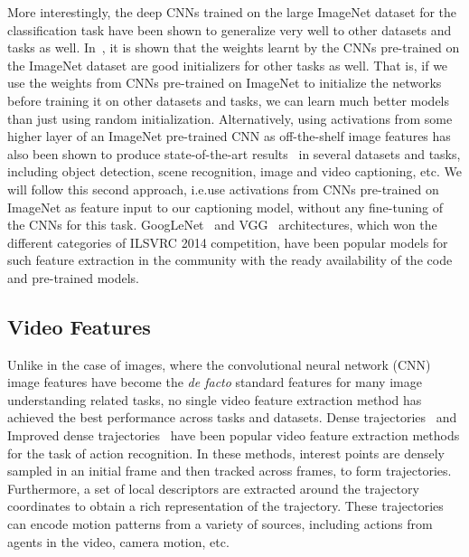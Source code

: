 More interestingly, the deep CNNs trained on the large ImageNet dataset for
the classification task have been shown to generalize very well to other
datasets and tasks as well.
In~\cite{yosinski2014transferable}, it is shown that the weights learnt by the
CNNs pre-trained on the ImageNet dataset are good initializers for other tasks
as well.
That is, if we use the weights from CNNs pre-trained on ImageNet to initialize
the networks before training it on other datasets and tasks, we can learn much
better models than just using random initialization. 
Alternatively, using activations from some higher layer of an ImageNet
pre-trained CNN as off-the-shelf image features has also been shown to produce
state-of-the-art results~\cite{Donahue2014, Razavian2014CVPR, ShettyACMMM2016,
ShettyACMMM2016Wrk} in several datasets and tasks, including object detection,
scene recognition, image and video captioning, etc.
We will follow this second approach, i.e.\@ use activations from CNNs
pre-trained on ImageNet as feature input to our captioning model, without any
fine-tuning of the CNNs for this task.
GoogLeNet~\cite{DBLP:journals/corr/SzegedyLJSRAEVR14} and VGG~\cite{Simonyan14c}
architectures, which won the different categories of ILSVRC 2014 competition,
have been popular models for such feature extraction in the community with the
ready availability of the code and pre-trained models.

\subsection{Video Features}
Unlike in the case of images, where the convolutional neural network (CNN) image
features have become the \emph{de facto} standard features for many image
understanding related tasks, no single video feature extraction method has
achieved the best performance across tasks and datasets.
Dense trajectories~\cite{DBLP:conf/cvpr/WangKSL11} and Improved dense
trajectories~\cite{Wang2013} have been popular video feature extraction methods
for the task of action recognition.
In these methods, interest points are densely sampled in an initial frame
and then tracked across frames, to form trajectories.
Furthermore, a set of local descriptors are extracted around the trajectory
coordinates to obtain a rich representation of the trajectory.
These trajectories can encode motion patterns from a variety of sources, including
actions from agents in the video, camera motion, etc.

